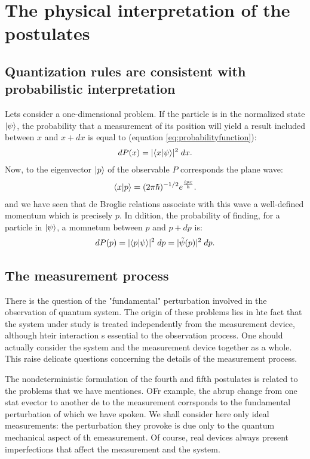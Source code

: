 \section{The physical interpretation of the postulates}

\subsection{Quantization rules are consistent with probabilistic interpretation}
Lets consider a one-dimensional problem. If the particle is in the normalized state $|\psi\rangle$, the probability that a 
measurement of its position will yield a result included between $x$ and $x+dx$ is equal to (equation \eqref{eq:probabilityfunction}):
\begin{align*}
    dP(x)=|\langle x|\psi\rangle|^2\;dx.
\end{align*}
Now, to the eigenvector $|p\rangle$ of the observable $P$ corresponds the plane wave:
\begin{align}
    \langle x|p\rangle=(2\pi\hbar)^{-1/2}e^{\frac{ipx}{\hbar}}.
\end{align}
and we have seen that de Broglie relations associate with this wave a well-defined momentum which is precisely $p$.
In ddition, the probability of finding, for a particle in $|\psi\rangle$, a momnetum between $p$ and $p+dp$ is:
\begin{align}
    dP(p)=|\langle p|\psi\rangle|^2\;dp=|\tilde{\psi}(p)|^2\;dp.
\end{align}
\subsection{The measurement process}
There is the question of the "fundamental" perturbation involved in the observation of quantum system.
The origin of these problems lies in hte fact that the system under study is treated independently from the measurement device, although hteir interaction s 
essential to the observation process. One should actually consider the system and the measurement device together as a whole. This raise 
delicate questions concerning the details of the measurement process.

The nondeterministic formulation of the fourth and fifth postulates is related to the problems that we have mentiones. OFr example, the abrup change from one stat evector 
to another de to the measurement corrsponds to the fundamental perturbation of which we have spoken.
We shall consider here only ideal measurements: the perturbation they provoke is due only to the quantum mechanical aspect of th emeasurement.
Of course, real devices always present imperfections that affect the measurement and the system.
